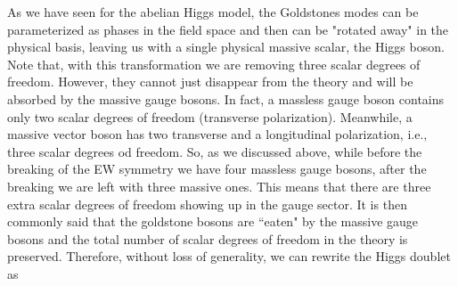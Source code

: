 As we have seen for the abelian Higgs model, the Goldstones modes can be parameterized as phases in the field space and then can be "rotated away" in the physical basis, leaving us with a single physical massive scalar, the Higgs boson. Note that, with this transformation we are removing three scalar degrees of freedom.  However, they cannot just disappear from the theory and will be absorbed by the massive gauge bosons.
%
In fact, a massless gauge boson contains only two scalar degrees of freedom (transverse polarization). Meanwhile, a massive vector boson has two transverse and a longitudinal polarization, i.e., three scalar degrees od freedom. So, as we discussed above, while before the breaking of the EW symmetry we have four massless gauge bosons, after the breaking we are left with three massive ones. This means that there are three extra scalar degrees of freedom showing up in the gauge sector. It is then commonly said that the goldstone bosons are ``eaten" by the massive gauge bosons and the total number of scalar degrees of freedom in the theory is preserved. Therefore, without loss of generality, we can rewrite the Higgs doublet as

